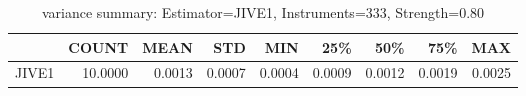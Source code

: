 \begin{table}[ht]
\centering
\caption{variance summary: Estimator=JIVE1, Instruments=333, Strength=0.80}
\begin{tabular}{lrrrrrrrr}
\toprule
 & COUNT & MEAN & STD & MIN & 25\% & 50\% & 75\% & MAX \\
\midrule
JIVE1 & 10.0000 & 0.0013 & 0.0007 & 0.0004 & 0.0009 & 0.0012 & 0.0019 & 0.0025 \\
\bottomrule
\end{tabular}
\end{table}
